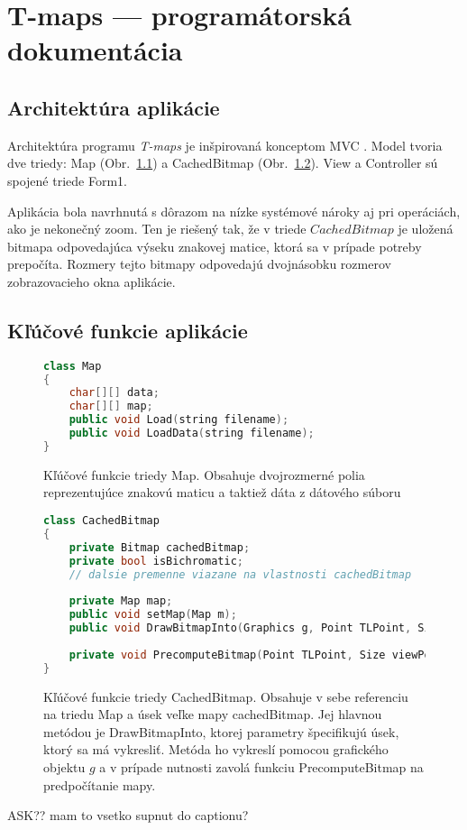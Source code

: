 \chapter{T-maps --- programátorská dokumentácia}
\label{programdoc}

\section{Architektúra aplikácie}
Architektúra programu \emph{T-maps} je inšpirovaná konceptom MVC \cite{krasner_mvc_1988}.
Model tvoria dve triedy: Map (Obr.~\ref{fig:map_interface}) a CachedBitmap (Obr.~\ref{fig:cachedbitmap_interface_plus}).
View a Controller sú spojené triede Form1.


Aplikácia bola navrhnutá s dôrazom na nízke systémové nároky aj pri operáciách, ako je nekonečný zoom. 
Ten je riešený tak, že v triede $CachedBitmap$  je uložená bitmapa odpovedajúca výseku znakovej matice, ktorá sa v prípade potreby prepočíta.
Rozmery tejto bitmapy odpovedajú dvojnásobku rozmerov zobrazovacieho okna aplikácie.

\section{Kľúčové funkcie aplikácie}



\begin{figure}[H]
\begin{lstlisting}[language=C++]
class Map
{
    char[][] data;
    char[][] map;
    public void Load(string filename);
    public void LoadData(string filename);
}
\end{lstlisting}
\caption{Kľúčové funkcie triedy Map. Obsahuje dvojrozmerné polia reprezentujúce znakovú maticu a taktiež dáta z dátového súboru}
\label{fig:map_interface}
\end{figure}



\begin{figure}[H]
\begin{lstlisting}[language=C++]
class CachedBitmap
{
    private Bitmap cachedBitmap;
    private bool isBichromatic;
	// dalsie premenne viazane na vlastnosti cachedBitmap
	
    private Map map;
    public void setMap(Map m);
    public void DrawBitmapInto(Graphics g, Point TLPoint, Size ViewPortSize, int squareS, bool isBichrom, bool forcePrecomputing = false);
 
    private void PrecomputeBitmap(Point TLPoint, Size viewPortSize);
}
\end{lstlisting}
\caption{Kľúčové funkcie triedy CachedBitmap. 
Obsahuje v sebe referenciu na triedu Map a úsek veľke mapy cachedBitmap. Jej hlavnou metódou je DrawBitmapInto,
ktorej parametry špecifikujú úsek, ktorý sa má vykresliť. Metóda ho vykreslí pomocou grafického objektu $g$ a v prípade nutnosti zavolá funkciu
PrecomputeBitmap na predpočítanie mapy.}
\label{fig:cachedbitmap_interface_plus}
\end{figure}

ASK?? mam to vsetko supnut do captionu?
